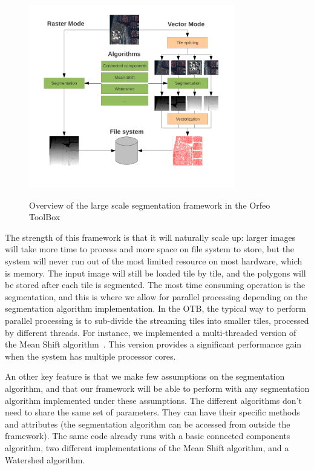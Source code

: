 \documentclass{josis}
\begin{document}
\begin{figure}[!htb]
\centering
\includegraphics[width=0.8\textwidth]{Pictures/schema_ogrs}\label{fig:overview}
\caption{Overview of the large scale segmentation framework in the Orfeo ToolBox}
\end{figure}

The strength of this framework is that it will naturally scale up:
larger images will take more time to process and more space on file
system to store, but the system will never run out of the most limited
resource on most hardware, which is memory. The input image will still
be loaded tile by tile, and the polygons will be stored after each
tile is segmented. The most time consuming operation is the
segmentation, and this is where we allow for parallel processing
depending on the segmentation algorithm implementation. In the OTB,
the typical way to perform parallel processing is to sub-divide the
streaming tiles into smaller tiles, processed by different
threads. For instance, we implemented a multi-threaded version of the
Mean Shift algorithm~\cite{Comaniciu2002mean}. This version provides a
significant performance gain when the system has multiple processor
cores.

An other key feature is that we make few assumptions on the
segmentation algorithm, and that our framework will be able to perform
with any segmentation algorithm implemented under these
assumptions. The different algorithms don't need to share the same set
of parameters. They can have their specific methods and attributes
(the segmentation algorithm can be accessed from outside the
framework). The same code already runs with a basic connected
components algorithm, two different implementations of the Mean Shift
algorithm, and a Watershed algorithm.
\end{document}
